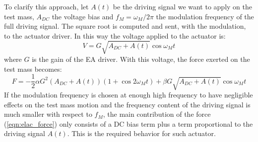 {To clarify this approach, let $A(t)$ be the driving signal we want to apply on the test mass, $A_{DC}$ the voltage bias and $f_M=\omega_M/2\pi$ the modulation frequency of the full driving signal. The square root is computed and sent, with the modulation, to the actuator driver. In this way the voltage applied to the actuator is:
\begin{equation}
\label{eqn:voltage}
V=G\sqrt{A_{DC}+A(t)}\cos{\omega_M t}
\end{equation}
where $G$ is the gain of the EA driver. With this voltage, the force exerted on the test mass becomes:
\begin{equation}
\label{eqn:elac_force}
F=-\frac{1}{2}\alpha G^2\left( A_{DC}+A(t)\right)\left(1+\cos{2\omega_M t}\right)+\beta G \sqrt{A_{DC}+A(t)}\cos{\omega_M t}
\end{equation}
If the modulation frequency is chosen at enough high frequency to have negligible effects on the test mass motion and the frequency content of the driving signal is much smaller with respect to $f_M$, the main contribution of the force (\ref{eqn:elac_force}) only consists of a DC bias term plus a term proportional to the driving signal $A(t)$. This is the required behavior for such actuator.

}
